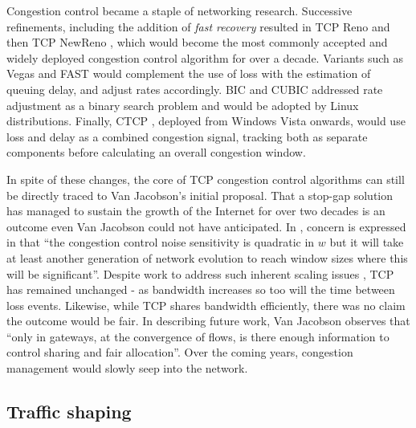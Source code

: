Congestion control became a staple of networking research. Successive refinements, including the addition of \textit{fast recovery} resulted in \ac{TCP} Reno \cite{Stevens:1997p466} and then \ac{TCP} NewReno \cite{Paxson:1999p467}, which would become the most commonly accepted and widely deployed congestion control algorithm for over a decade. Variants such as Vegas \cite{Brakmo:1994p468} and \ac{FAST} \cite{Wei:2006p469} would complement the use of loss with the estimation of queuing delay, and adjust rates accordingly. \ac{BIC} and CUBIC \cite{Xu:2004p470,Ha:2008p471} addressed rate adjustment as a binary search problem and would be adopted by Linux distributions. Finally, \ac{CTCP} \cite{Zhang:2012p472}, deployed from Windows Vista onwards, would use loss and delay as a combined congestion signal, tracking both as separate components before calculating an overall congestion window.

In spite of these changes, the core of \ac{TCP} congestion control algorithms can still be directly traced to Van Jacobson's initial proposal. 
That a stop-gap solution has managed to sustain the growth of the Internet for over two decades is an outcome even Van Jacobson could not have anticipated. 
In \cite{Jacobson:1988p398}, concern is expressed in that ``the congestion control noise sensitivity is quadratic in $w$ but it will take at least another generation of network evolution to reach window sizes where this will be significant''. 
Despite work to address such inherent scaling issues \cite{Mathis:2009p309,Kelly:2003p475}, \ac{TCP} has remained unchanged - as bandwidth increases so too will the time between loss events.
Likewise, while \ac{TCP} shares bandwidth efficiently, there was no claim the outcome would be fair. In describing future work, Van Jacobson observes that ``only in gateways, at the convergence of flows, is there enough information to control sharing and fair allocation''. 
Over the coming years, congestion management would slowly seep into the network.




\subsection{Traffic shaping}
\label{sec:resourcepooling:shaping}

